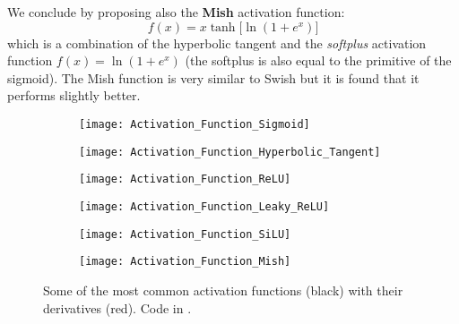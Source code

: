We conclude by proposing also the \textbf{Mish} activation function:
\begin{equation}
f(x)=x\tanh{\bigl[\ln{(1+e^x)}\bigr]}
\end{equation}
which is a combination of the hyperbolic tangent and the \emph{softplus} activation function $f(x)=\ln{(1+e^x)}$ (the softplus is also equal to the primitive of the sigmoid). The Mish function is very similar to Swish but it is found that it performs slightly better.
\begin{figure}[h!t]
\centering
\begin{subfigure}[ht]{0.49\textwidth}
	\centering
	\texttt{[image: Activation\_Function\_Sigmoid]}
	\caption{}\label{Activation_Function_Sigmoid}
\end{subfigure}
\hfill
\begin{subfigure}[ht]{0.49\textwidth}
	\centering
	\texttt{[image: Activation\_Function\_Hyperbolic\_Tangent]}
        \caption{}\label{Activation_Function_Hyperbolic_Tangent}
\end{subfigure}

\vspace{\baselineskip}\noindent
\begin{subfigure}[ht]{0.49\textwidth}
	\centering
	\texttt{[image: Activation\_Function\_ReLU]}
	\caption{}\label{Activation_Function_ReLU}
\end{subfigure}
\hfill
\begin{subfigure}[ht]{0.49\textwidth}
	\centering
	\texttt{[image: Activation\_Function\_Leaky\_ReLU]}
        \caption{}\label{Activation_Function_Leaky_ReLU}
\end{subfigure}

\vspace{\baselineskip}\noindent
\begin{subfigure}[ht]{0.49\textwidth}
	\centering
	\texttt{[image: Activation\_Function\_SiLU]}
	\caption{}\label{Activation_Function_SiLU}
\end{subfigure}
\hfill
\begin{subfigure}[ht]{0.49\textwidth}
	\centering
	\texttt{[image: Activation\_Function\_Mish]}
        \caption{}\label{Activation_Function_Mish}
\end{subfigure}
\caption{Some of the most common activation functions (black) with their derivatives (red). Code in .}
\end{figure}

